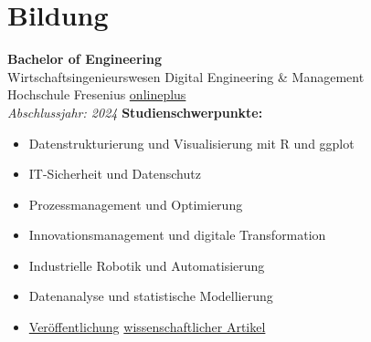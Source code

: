 \documentclass[a4paper,10pt]{article}
\begin{document}
\vspace{5pt}

\section*{Bildung} \label{sec:education}
\textbf{Bachelor of Engineering} \\
Wirtschaftsingenieurswesen Digital Engineering \& Management \\  
Hochschule Fresenius \href{https://www.hs-fresenius.de/hochschule/fachbereiche/onlineplus/}{onlineplus} \\  
\textit{Abschlussjahr: 2024}  
\vspace{5pt}
\textbf{Studienschwerpunkte:}  
\begin{itemize}
    \item Datenstrukturierung und Visualisierung mit R und ggplot  
    \item IT-Sicherheit und Datenschutz  
    \item Prozessmanagement und Optimierung  
    \item Innovationsmanagement und digitale Transformation  
    \item Industrielle Robotik und Automatisierung  
    \item Datenanalyse und statistische Modellierung  
    \item \hyperref[sec:publications]{Veröffentlichung} {\href{https://grin.com/user/5344426}{wissenschaftlicher Artikel}}
\end{itemize}

\vspace{10pt}  
\end{document}
